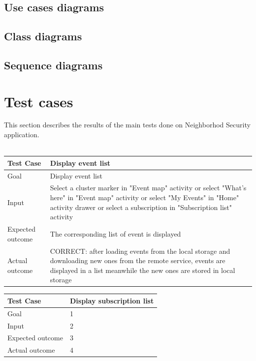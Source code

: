 \documentclass[a4paper]{scrreprt}
\begin{document}
\section{Use cases diagrams}

\section{Class diagrams}

\section{Sequence diagrams}


\chapter{Test cases}
This section describes the results of the main tests done on Neighborhod Security application.\\\\
\bigskip
\noindent
\begin{tabularx}{\linewidth}{|l|X|}
	\hline
	\textbf{Test Case} 	& \textbf{Display event list} \\ \hline
	Goal 				& Display event list \\ \hline
	Input 				& Select a cluster marker in  "Event map" activity or select "What's here" in  "Event map" activity or select "My Events" in "Home" activity drawer or select a subscription in "Subscription list" activity \\ \hline
	Expected outcome 	& The corresponding list of event is displayed \\ \hline
	Actual outcome 		& CORRECT: after loading events from the local storage and downloading new ones from the remote service, events are displayed in a list meanwhile the new ones are stored in local storage \\ \hline
\end{tabularx}
\bigskip
\noindent
\begin{tabularx}{\linewidth}{|l|X|}
	\hline
	\textbf{Test Case} 	& \textbf{Display subscription list} \\ \hline
	Goal 				& 1 \\ \hline
	Input 				& 2 \\ \hline
	Expected outcome 	& 3 \\ \hline
	Actual outcome 		& 4 \\ \hline
\end{tabularx}
\end{document}
